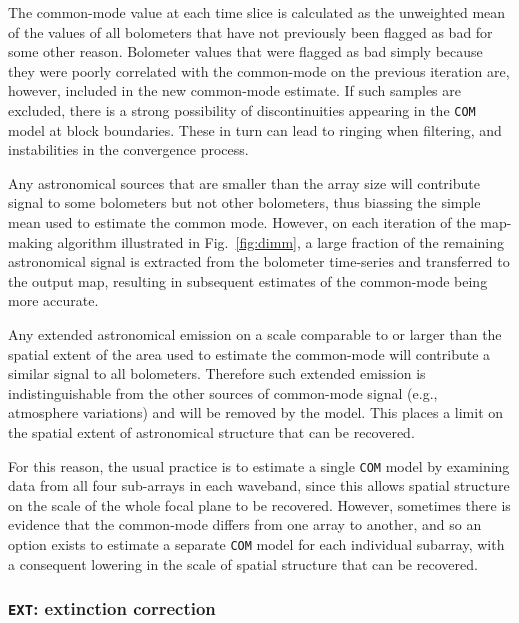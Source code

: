 \documentclass[useAMS,usenatbib,nofootinbib]{mn2e}
\newcommand{\model}[1]{\texttt{#1}}
\begin{document}
The common-mode value at each time slice is calculated as the
unweighted mean of the values of all bolometers that have not
previously been flagged as bad for some other reason. Bolometer values
that were flagged as bad simply because they were poorly correlated
with the common-mode on the previous iteration are, however, included
in the new common-mode estimate. If such samples are excluded, there
is a strong possibility of discontinuities appearing in the
\model{COM} model at block boundaries.  These in turn can lead to
ringing when filtering, and instabilities in the convergence process.

Any astronomical sources that are smaller than the array size will
contribute signal to some bolometers but not other bolometers, thus
biassing the simple mean used to estimate the common mode. However, on
each iteration of the map-making algorithm illustrated in
Fig.~\ref{fig:dimm}, a large fraction of the remaining astronomical
signal is extracted from the bolometer time-series and transferred to the
output map, resulting in subsequent estimates of the common-mode being
more accurate.

Any extended astronomical emission on a scale comparable to or larger
than the spatial extent of the area used to estimate the common-mode
will contribute a similar signal to all bolometers. Therefore such
extended emission is indistinguishable from the other sources of
common-mode signal (e.g., atmosphere variations) and will be removed by
the model. This places a limit on the spatial extent of astronomical
structure that can be recovered.

For this reason, the usual practice is to estimate a single
\model{COM} model by examining data from all four sub-arrays in each
waveband, since this allows spatial structure on the scale of the
whole focal plane to be recovered. However, sometimes there is
evidence that the common-mode differs from one array to another, and
so an option exists to estimate a separate \model{COM} model for each
individual subarray, with a consequent lowering in the scale of
spatial structure that can be recovered.

\subsubsection{\model{EXT}: extinction correction}
\label{sec:ext}
\end{document}
